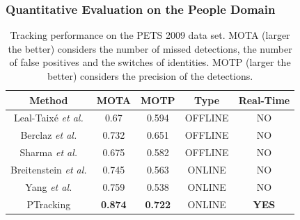 \begin{frame}
	\frametitle{Quantitative Evaluation on the People Domain}
	
	\begin{table}[!t]
		\renewcommand{\arraystretch}{1.3}
		\caption{Tracking performance on the PETS 2009 data set. MOTA (larger the better)
				 considers the number of missed detections, the number of false positives
				 and the switches of identities. MOTP (larger the better) considers the
				 precision of the detections.}
		\centering
		\vspace{0.2cm}
		
		\begin{tabular}{ccccc}
			\hline
			\hline
			\textbf{Method} & \textbf{MOTA} & \textbf{MOTP} & \textbf{Type} & \textbf{Real-Time} \\
			\hline
			Leal-Taix\'{e} \emph{et al.} & 0.67 & 0.594 & OFFLINE & NO \\
			\hline
			Berclaz \emph{et al.} & 0.732 & 0.651 & OFFLINE & NO \\
			\hline
			Sharma \emph{et al.} & 0.675 & 0.582 & OFFLINE & NO \\
			\hline
			Breitenstein \emph{et al.} & 0.745 & 0.563 & ONLINE & NO \\
			\hline
			Yang \emph{et al.} & 0.759 & 0.538 & ONLINE & NO \\
			\hline
			PTracking & \textbf{0.874} & \textbf{0.722} & ONLINE & \textbf{YES} \\
			\hline
		\hline
		\end{tabular}
	\end{table}
\end{frame}

